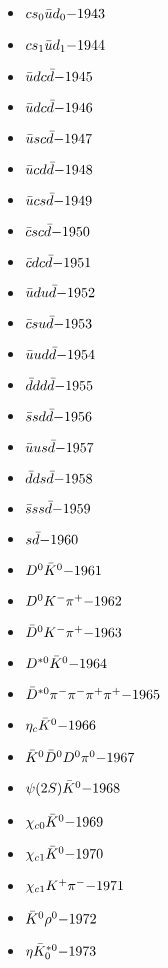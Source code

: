 \begin{multicols}{3}
\begin{itemize}
 \item $ cs_{0} \bar{u}d_{0} \hfill{-1943}$
 \item $ cs_{1} \bar{u}d_{1} \hfill{-1944}$
 \item $ \bar{u} d c \bar{d} \hfill{-1945}$
 \item $ \bar{u} d c \bar{d} \hfill{-1946}$
 \item $ \bar{u} s c \bar{d} \hfill{-1947}$
 \item $ \bar{u} c d \bar{d} \hfill{-1948}$
 \item $ \bar{u} c s \bar{d} \hfill{-1949}$
 \item $ \bar{c} s c \bar{d} \hfill{-1950}$
 \item $ \bar{c} d c \bar{d} \hfill{-1951}$
 \item $ \bar{u} d u \bar{d} \hfill{-1952}$
 \item $ \bar{c} s u \bar{d} \hfill{-1953}$
 \item $ \bar{u} u d \bar{d} \hfill{-1954}$
 \item $ \bar{d} d d \bar{d} \hfill{-1955}$
 \item $ \bar{s} s d \bar{d} \hfill{-1956}$
 \item $ \bar{u} u s \bar{d} \hfill{-1957}$
 \item $ \bar{d} d s \bar{d} \hfill{-1958}$
 \item $ \bar{s} s s \bar{d} \hfill{-1959}$
 \item $ s \bar{d} \hfill{-1960}$
 \item $ D^{0} \bar{K}^{0} \hfill{-1961}$
 \item $ D^{0} K^{-} \pi^{+} \hfill{-1962}$
 \item $ \bar{D}^{0} K^{-} \pi^{+} \hfill{-1963}$
 \item $ D^{*0} \bar{K}^{0} \hfill{-1964}$
 \item $ \bar{D}^{*0} \pi^{-} \pi^{-} \pi^{+} \pi^{+} \hfill{-1965}$
 \item $ \eta_{c} \bar{K}^{0} \hfill{-1966}$
 \item $ \bar{K}^{0} \bar{D}^{0} D^{0} \pi^{0} \hfill{-1967}$
 \item $ \psi(2S) \bar{K}^{0} \hfill{-1968}$
 \item $ \chi_{c0} \bar{K}^{0} \hfill{-1969}$
 \item $ \chi_{c1} \bar{K}^{0} \hfill{-1970}$
 \item $ \chi_{c1} K^{+} \pi^{-} \hfill{-1971}$
 \item $ \bar{K}^{0} \rho^{0} \hfill{-1972}$
 \item $ \eta \bar{K}_{0}^{*0} \hfill{-1973}$

\end{itemize}
\end{multicols}
